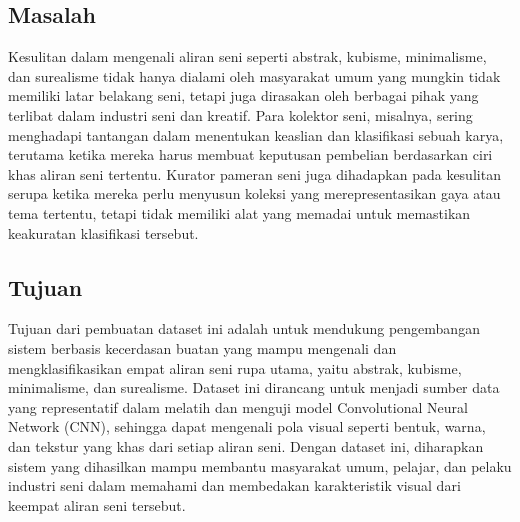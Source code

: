 \documentclass[12pt,a4paper]{article}
\begin{document}
\subsection{Masalah}
\begin{adjustwidth}{3em}{0pt} 
\hspace{0.5cm} Kesulitan dalam mengenali aliran seni seperti abstrak, kubisme, minimalisme, dan surealisme tidak hanya dialami oleh masyarakat umum yang mungkin tidak memiliki latar belakang seni, tetapi juga dirasakan oleh berbagai pihak yang terlibat dalam industri seni dan kreatif. Para kolektor seni, misalnya, sering menghadapi tantangan dalam menentukan keaslian dan klasifikasi sebuah karya, terutama ketika mereka harus membuat keputusan pembelian berdasarkan ciri khas aliran seni tertentu. Kurator pameran seni juga dihadapkan pada kesulitan serupa ketika mereka perlu menyusun koleksi yang merepresentasikan gaya atau tema tertentu, tetapi tidak memiliki alat yang memadai untuk memastikan keakuratan klasifikasi tersebut. 
 \end{adjustwidth}

\subsection{Tujuan}
\begin{adjustwidth}{3em}{0pt} 
\hspace{0.5cm} Tujuan dari pembuatan dataset ini adalah untuk mendukung pengembangan sistem berbasis kecerdasan buatan yang mampu mengenali dan mengklasifikasikan empat aliran seni rupa utama, yaitu abstrak, kubisme, minimalisme, dan surealisme. Dataset ini dirancang untuk menjadi sumber data yang representatif dalam melatih dan menguji model Convolutional Neural Network (CNN), sehingga dapat mengenali pola visual seperti bentuk, warna, dan tekstur yang khas dari setiap aliran seni. Dengan dataset ini, diharapkan sistem yang dihasilkan mampu membantu masyarakat umum, pelajar, dan pelaku industri seni dalam memahami dan membedakan karakteristik visual dari keempat aliran seni tersebut.

\end{adjustwidth}


\end{document}
